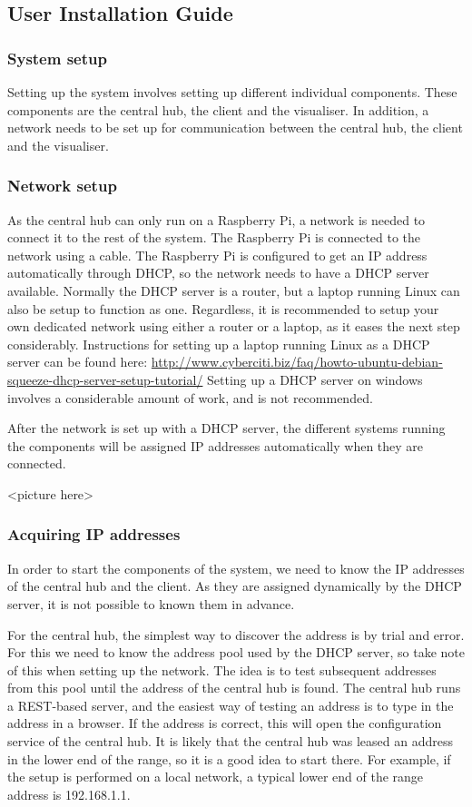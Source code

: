 \documentclass[../document.tex]{subfiles}
\begin{document}
\subsection{User Installation Guide}

\subsubsection{System setup}
Setting up the system involves setting up different individual components. These components are the central hub, the client and the visualiser. In addition, a network needs to be set up for communication between the central hub, the client and the visualiser.

\subsubsection{Network setup}
As the central hub can only run on a Raspberry Pi, a network is needed to connect it to the rest of the system. The Raspberry Pi is connected to the network using a cable. The Raspberry Pi is configured to get an IP address automatically through DHCP, so the network needs to have a DHCP server available. Normally the DHCP server is a router, but a laptop running Linux can also be setup to function as one. Regardless, it is recommended to setup your own dedicated network using either a router or a laptop, as it eases the next step considerably. Instructions for setting up a laptop running Linux as a DHCP server can be found here:
	\url{http://www.cyberciti.biz/faq/howto-ubuntu-debian-squeeze-dhcp-server-setup-tutorial/}
Setting up a DHCP server on windows involves a considerable amount of work, and is not recommended.

After the network is set up with a DHCP server, the different systems running the components will be assigned IP addresses automatically when they are connected.

{\color{red} <picture here>}

\subsubsection{Acquiring IP addresses}
In order to start the components of the system, we need to know the IP addresses of the central hub and the client. As they are assigned dynamically by the DHCP server, it is not possible to known them in advance.

For the central hub, the simplest way to discover the address is by trial and error. For this we need to know the address pool used by the DHCP server, so take note of this when setting up the network. The idea is to test subsequent addresses from this pool until the address of the central hub is found. The central hub runs a REST-based server, and the easiest way of testing an address is to type in the address in a browser. If the address is correct, this will open the configuration service of the central hub. It is likely that the central hub was leased an address in the lower end of the range, so it is a good idea to start there. For example, if the setup is performed on a local network, a typical lower end of the range address is 192.168.1.1.
\end{document}

